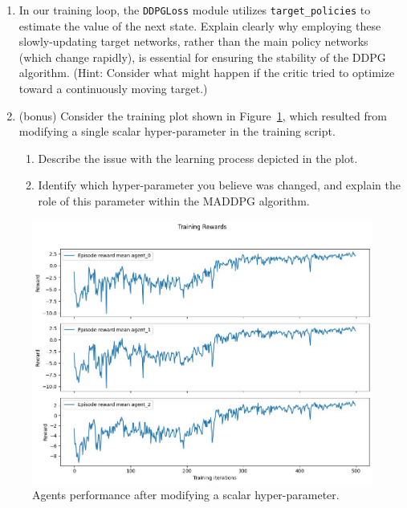 \documentclass[12pt]{article}
\begin{document}
{{{{{{\begin{enumerate}
    \item In our training loop, the \texttt{DDPGLoss} module utilizes \texttt{target\_policies} to estimate the value of the next state. Explain clearly why employing these slowly-updating target networks, rather than the main policy networks (which change rapidly), is essential for ensuring the stability of the DDPG algorithm. (Hint: Consider what might happen if the critic tried to optimize toward a continuously moving target.)

    \item (bonus) Consider the training plot shown in Figure~\ref{fig:unstable_learning}, which resulted from modifying a single scalar hyper-parameter in the training script.
    \begin{enumerate}
        \item Describe the issue with the learning process depicted in the plot.
        \item Identify which hyper-parameter you believe was changed, and explain the role of this parameter within the MADDPG algorithm.
    \end{enumerate}
\end{enumerate}

\begin{figure}[h!]
    \centering
    \includegraphics[width=0.75\linewidth]{figs/results.jpg}
    \caption{Agents performance after modifying a scalar hyper-parameter.}
    \label{fig:unstable_learning}
\end{figure}




}}



\newpage

}}}}
\end{document}
